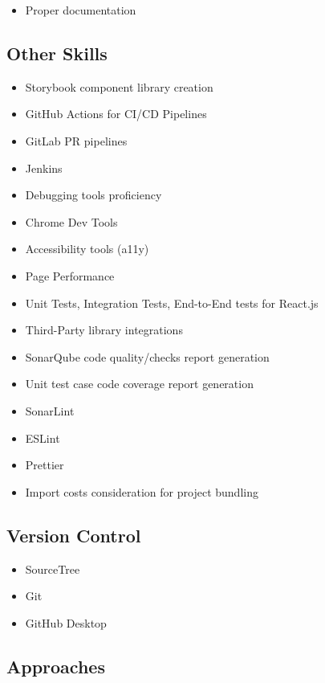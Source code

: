 \documentclass[letterpaper]{deedy-resume} %
\begin{document}
\begin{minipage}[t]{0.33\textwidth}
\begin{itemize}
\setlength\itemsep{-0.5em} %
\item Proper documentation
\end{itemize}

\subsection{Other Skills}

\begin{itemize}
\setlength\itemsep{-0.5em} %
\item Storybook component library creation
\item GitHub Actions for CI/CD Pipelines
\item GitLab PR pipelines
\item Jenkins
\item Debugging tools proficiency
\item Chrome Dev Tools
\item Accessibility tools (a11y)
\item Page Performance
\item Unit Tests, Integration Tests, End-to-End tests for React.js
\item Third-Party library integrations
\item SonarQube code quality/checks report generation
\item Unit test case code coverage report generation
\item SonarLint
\item ESLint
\item Prettier
\item Import costs consideration for project bundling
\end{itemize}

\subsection{Version Control}

\begin{itemize}
\setlength\itemsep{-0.5em} %
\item SourceTree
\item Git
\item GitHub Desktop
\end{itemize}

\subsection{Approaches}


\end{minipage}
\end{document}
